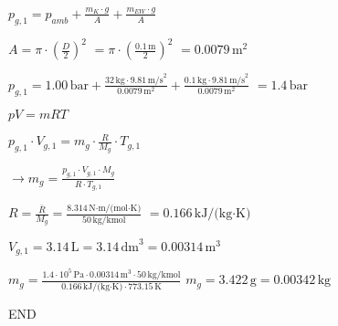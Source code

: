 \( p_{g,1} = p_{amb} + \frac{m_K \cdot g}{A} + \frac{m_{EW} \cdot g}{A} \)  

\( A = \pi \cdot \left(\frac{D}{2}\right)^2 \)  
\( = \pi \cdot \left(\frac{0.1 \, \text{m}}{2}\right)^2 \)  
\( = 0.0079 \, \text{m}^2 \)  

\( p_{g,1} = 1.00 \, \text{bar} + \frac{32 \, \text{kg} \cdot 9.81 \, \text{m/s}^2}{0.0079 \, \text{m}^2} + \frac{0.1 \, \text{kg} \cdot 9.81 \, \text{m/s}^2}{0.0079 \, \text{m}^2} \)  
\( = 1.4 \, \text{bar} \)  

\( pV = mRT \)  

\( p_{g,1} \cdot V_{g,1} = m_g \cdot \frac{R}{M_g} \cdot T_{g,1} \)  

\( \rightarrow m_g = \frac{p_{g,1} \cdot V_{g,1} \cdot M_g}{R \cdot T_{g,1}} \)  

\( R = \frac{\bar{R}}{M_g} = \frac{8.314 \, \text{N·m/(mol·K)}}{50 \, \text{kg/kmol}} \)  
\( = 0.166 \, \text{kJ/(kg·K)} \)  

\( V_{g,1} = 3.14 \, \text{L} = 3.14 \, \text{dm}^3 = 0.00314 \, \text{m}^3 \)  

\( m_g = \frac{1.4 \cdot 10^5 \, \text{Pa} \cdot 0.00314 \, \text{m}^3 \cdot 50 \, \text{kg/kmol}}{0.166 \, \text{kJ/(kg·K)} \cdot 773.15 \, \text{K}} \)  
\( m_g = 3.422 \, \text{g} = 0.00342 \, \text{kg} \)  

END